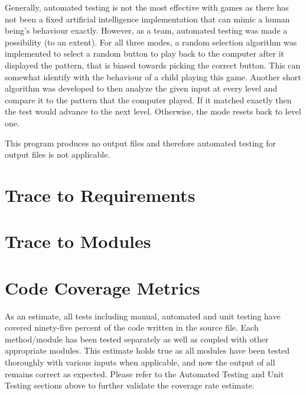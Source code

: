 \documentclass[12pt, titlepage]{article}
\begin{document}
\par Generally, automated testing is not the most effective with games as there has not been a fixed artificial intelligence implementation that can mimic a human being’s behaviour exactly. However, as a team, automated testing was made a possibility (to an extent). For all three modes, a random selection algorithm was implemented to select a random button to play back to the computer after it displayed the pattern, that is biased towards picking the correct button. This can somewhat identify with the behaviour of a child playing this game. Another short algorithm was developed to then analyze the given input at every level and compare it to the pattern that the computer played. If it matched exactly then the test would advance to the next level. Otherwise, the mode resets back to level one.
\\
\par This program produces no output files and therefore automated testing for output files is not applicable.

		
\section{Trace to Requirements}
		
\section{Trace to Modules}		

\section{Code Coverage Metrics}

\par As an estimate, all tests including manual, automated and unit testing have covered ninety-five percent of the code written in the source file. Each method/module has been tested separately as well as coupled with other appropriate modules. This estimate holds true as all modules have been tested thoroughly with various inputs when applicable, and now the output of all remains correct as expected. Please refer to the Automated Testing and Unit Testing sections above to further validate the coverage rate estimate.




\end{document}
